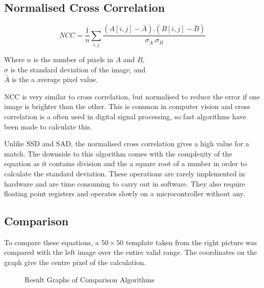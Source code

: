 \subsection{Normalised Cross Correlation}\label{Section:NCC}
\begin{equation}\label{eq:NCC}
NCC =  \frac{1}{n}\sum\limits_{i,j} \frac{(A[i,j] - \bar{A}).(B[i,j] - \bar{B})}{\sigma _A . \sigma _B}
\end{equation}
\begin{center}
Where $n$ is the number of pixels in $A$ and $B$, \\$\sigma$ is the standard deviation of the image, and \\$\bar{A}$ is the a average pixel value. 
\end{center}
NCC is very similar to cross correlation, but normalised to reduce the error if one image is brighter than the other. This is common in computer vision \citep{Tsai:NCC} and cross correlation is a often used in digital signal processing, so fast algorithms have been made to calculate this. 

Unlike SSD and SAD, the normalised cross correlation gives a high value for a match. The downside to this algorithm comes with the complexity of the equation as it contains division and the a square root of a number in order to calculate the standard deviation. These operations are rarely implemented in hardware and are time consuming to carry out in software. They also require floating point registers and operates slowly on a microcontroller without any. 



\subsection{Comparison}

To compare these equations, a $50 \times 50$ template taken from the right picture was compared with the left image over the entire valid range. The coordinates on the graph give the centre pixel of the calculation. 

\begin{figure}
\centering
{}
\caption{Result Graphs of Comparison Algorithms}
\label{fg:CompResults}
\end{figure}

